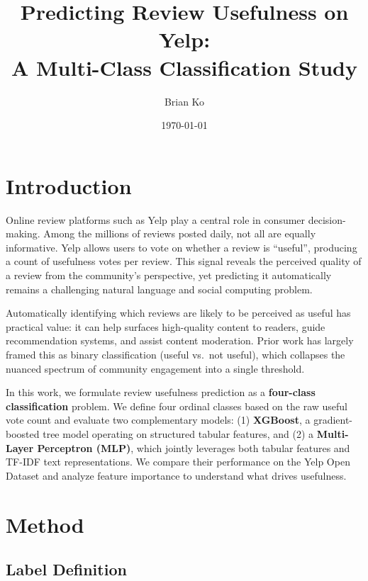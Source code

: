 \documentclass[11pt,a4paper]{article}
\title{\textbf{Predicting Review Usefulness on Yelp:\\
A Multi-Class Classification Study}}
\author{Brian Ko}
\date{\today}
\begin{document}
\maketitle
\tableofcontents
\newpage

\section{Introduction}

Online review platforms such as Yelp play a central role in consumer
decision-making. Among the millions of reviews posted daily, not all
are equally informative. Yelp allows users to vote on whether a review
is ``useful'', producing a count of usefulness votes per review. This
signal reveals the perceived quality of a review from the community's
perspective, yet predicting it automatically remains a challenging
natural language and social computing problem.

Automatically identifying which reviews are likely to be perceived as
useful has practical value: it can help surfaces high-quality content
to readers, guide recommendation systems, and assist content moderation.
Prior work has largely framed this as binary classification (useful
vs.\ not useful), which collapses the nuanced spectrum of community
engagement into a single threshold.

In this work, we formulate review usefulness prediction as a
\textbf{four-class classification} problem. We define four ordinal
classes based on the raw useful vote count and evaluate two
complementary models: (1) \textbf{XGBoost}, a gradient-boosted tree
model operating on structured tabular features, and (2) a
\textbf{Multi-Layer Perceptron (MLP)}, which jointly leverages both
tabular features and TF-IDF text representations. We compare their
performance on the Yelp Open Dataset and analyze feature importance to
understand what drives usefulness.

\section{Method}

\subsection{Label Definition}
\end{document}

